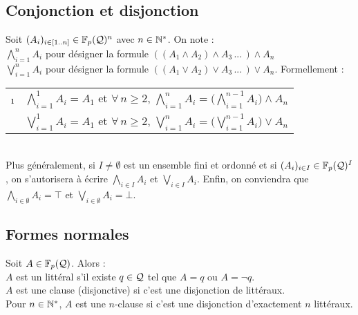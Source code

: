 	\subsection{Conjonction et disjonction}
		
		\pagebreak
		\begin{Notations}
			Soit \((A_i)_{i \in [1..n]} \in \bb{F}_p(\cal{Q})^n\) avec \(n \in \bb{N}^*\). On note : \\
				 \bdot \(\displaystyle \bigwedge\nolimits_{i=1}^n A_i\) pour désigner la formule \(\left((A_1 \wedge A_2) \wedge A_3 \, ... \, \right) \wedge A_n\) \\[1mm]
				 \bdot \(\displaystyle \bigvee\nolimits_{i=1}^n A_i\) pour désigner la formule \(((A_1 \vee A_2) \vee A_3 \, ... \,) \vee A_n\). \colsep{1.5pt} \nt
			Formellement :
			\begin{tabular}[t]{cl}
					\i & \(\displaystyle \bigwedge_{i=1}^1 A_i = A_1\) et \(\displaystyle \forall\,n \geq 2, \, \bigwedge_{i=1}^{n} A_i = \bigg(\bigwedge_{i=1}^{n-1} A_i\bigg) \wedge A_n\) \\[5mm]
					\ii & \(\displaystyle \bigvee_{i=1}^1 A_i = A_1\) et \(\displaystyle \forall\,n \geq 2,\,\bigvee_{i=1}^{n} A_i = \bigg(\bigvee_{i=1}^{n-1} A_i\bigg) \vee A_n\)
			\end{tabular} \\[4mm]
			Plus généralement, si \(I \neq \emptyset\) est un ensemble fini et ordonné et si \((A_i)_{i \in I} \in \bb{F}_p(\cal{Q})^I\), on s'autorisera à écrire \(\displaystyle \bigwedge_{i \in I} A_i\) et \(\displaystyle \bigvee_{i \in I} A_i\). Enfin, on conviendra que \(\displaystyle \bigwedge_{i \in \emptyset} A_i = \top\) et \(\displaystyle \bigvee_{i \in \emptyset} A_i = \bot\).
		\end{Notations}
		
	\subsection{Formes normales}
		
		\begin{Definitions}
			Soit \(A \in \bb{F}_p(\cal{Q})\). Alors : \\
			 \bdot \(A\) est un littéral s'il existe \(q \in \cal{Q}\) tel que \(A = q\) ou \(A = \neg q\). \\
			 \bdot \(A\) est une clause (disjonctive) si c'est une disjonction de littéraux. \\
			 \bdot Pour \(n \in \bb{N}^*\), \(A\) est une \(n\)-clause si c'est une disjonction d'exactement \(n\) littéraux.
		\end{Definitions}
	
